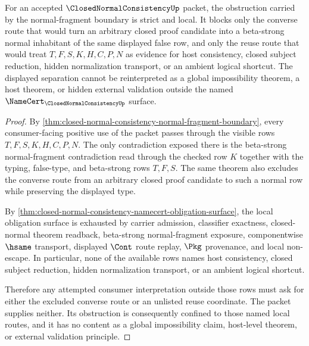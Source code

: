 \begin{corollary}
\label{cor:closed-normal-consistency-strict-local-obstruction}
For an accepted $\ClosedNormalConsistencyUp$ packet, the obstruction carried by the normal-fragment boundary is strict and local. It blocks only the converse route that would turn an arbitrary closed proof candidate into a beta-strong normal inhabitant of the same displayed false row, and only the reuse route that would treat $T,F,S,K,H,C,P,N$ as evidence for host consistency, closed subject reduction, hidden normalization transport, or an ambient logical shortcut. The displayed separation cannot be reinterpreted as a global impossibility theorem, a host theorem, or hidden external validation outside the named $\NameCert_{\ClosedNormalConsistencyUp}$ surface.
\end{corollary}
\begin{proof}
By \autoref{thm:closed-normal-consistency-normal-fragment-boundary}, every consumer-facing positive use of the packet passes through the visible rows $T,F,S,K,H,C,P,N$. The only contradiction exposed there is the beta-strong normal-fragment contradiction read through the checked row $K$ together with the typing, false-type, and beta-strong rows $T,F,S$. The same theorem also excludes the converse route from an arbitrary closed proof candidate to such a normal row while preserving the displayed type.

By \autoref{thm:closed-normal-consistency-namecert-obligation-surface}, the local obligation surface is exhausted by carrier admission, classifier exactness, closed-normal theorem readback, beta-strong normal-fragment exposure, componentwise $\hsame$ transport, displayed $\Cont$ route replay, $\Pkg$ provenance, and local non-escape. In particular, none of the available rows names host consistency, closed subject reduction, hidden normalization transport, or an ambient logical shortcut.

Therefore any attempted consumer interpretation outside those rows must ask for either the excluded converse route or an unlisted reuse coordinate. The packet supplies neither. Its obstruction is consequently confined to those named local routes, and it has no content as a global impossibility claim, host-level theorem, or external validation principle.
\end{proof}


